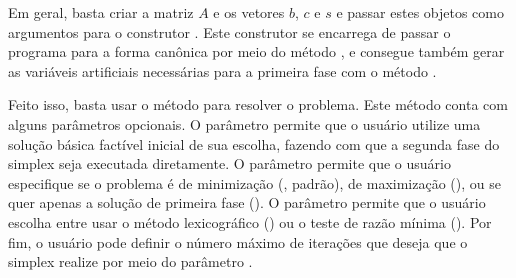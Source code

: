
Em geral, basta criar a matriz $A$ e os vetores $b$, $c$ e $s$ e passar estes objetos como argumentos para o construtor \href{https://github.com/phcentenaro7/Caique.jl/blob/9c78027f1884181846a6321a5640f92c9a718ce4/src/LinearProgram.jl#L13C9-L13C9}{}. Este construtor se encarrega de passar o programa para a forma canônica por meio do método \href{https://github.com/phcentenaro7/Caique.jl/blob/9c78027f1884181846a6321a5640f92c9a718ce4/src/LinearProgram.jl#L41C1-L41C1}{}, e consegue também gerar as variáveis artificiais necessárias para a primeira fase com o método \href{https://github.com/phcentenaro7/Caique.jl/blob/9c78027f1884181846a6321a5640f92c9a718ce4/src/LinearProgram.jl#L73}{}.

Feito isso, basta usar o método \href{https://github.com/phcentenaro7/Caique.jl/blob/main/src/Solve.jl}{} para resolver o problema. Este método conta com alguns parâmetros opcionais. O parâmetro  permite que o usuário utilize uma solução básica factível inicial de sua escolha, fazendo com que a segunda fase do simplex seja executada diretamente. O parâmetro  permite que o usuário especifique se o problema é de minimização (, padrão), de maximização (), ou se quer apenas a solução de primeira fase (). O parâmetro  permite que o usuário escolha entre usar o método lexicográfico () ou o teste de razão mínima (). Por fim, o usuário pode definir o número máximo de iterações que deseja que o simplex realize por meio do parâmetro .

